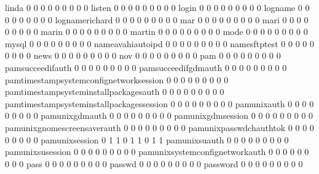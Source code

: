 \documentclass[compress,8pt]{beamer}
\begin{document}
\begin{frame}
\begin{Schunk}
  linda                                      0   0   0   0   0   0   0   0   0
  listen                                     0   0   0   0   0   0   0   0   0
  login                                      0   0   0   0   0   0   0   0   0
  logname                                    0   0   0   0   0   0   0   0   0
  lognamerichard                             0   0   0   0   0   0   0   0   0
  mar                                        0   0   0   0   0   0   0   0   0
  mari                                       0   0   0   0   0   0   0   0   0
  marin                                      0   0   0   0   0   0   0   0   0
  martin                                     0   0   0   0   0   0   0   0   0
  mode                                       0   0   0   0   0   0   0   0   0
  mysql                                      0   0   0   0   0   0   0   0   0
  nameavahiautoipd                           0   0   0   0   0   0   0   0   0
  namesftptest                               0   0   0   0   0   0   0   0   0
  news                                       0   0   0   0   0   0   0   0   0
  nov                                        0   0   0   0   0   0   0   0   0
  pam                                        0   0   0   0   0   0   0   0   0
  pamsucceedifauth                           0   0   0   0   0   0   0   0   0
  pamsucceedifgdmauth                        0   0   0   0   0   0   0   0   0
  pamtimestampsystemconfignetworksession     0   0   0   0   0   0   0   0   0
  pamtimestampsysteminstallpackagesauth      0   0   0   0   0   0   0   0   0
  pamtimestampsysteminstallpackagessession   0   0   0   0   0   0   0   0   0
  pamunixauth                                0   0   0   0   0   0   0   0   0
  pamunixgdmauth                             0   0   0   0   0   0   0   0   0
  pamunixgdmsession                          0   0   0   0   0   0   0   0   0
  pamunixgnomescreensaverauth                0   0   0   0   0   0   0   0   0
  pamunixpasswdchauthtok                     0   0   0   0   0   0   0   0   0
  pamunixsession                             0   1   1   0   1   1   0   1   1
  pamunixsuauth                              0   0   0   0   0   0   0   0   0
  pamunixsusession                           0   0   0   0   0   0   0   0   0
  pamunixsystemconfignetworkauth             0   0   0   0   0   0   0   0   0
  pass                                       0   0   0   0   0   0   0   0   0
  passwd                                     0   0   0   0   0   0   0   0   0
  password                                   0   0   0   0   0   0   0   0   0

\end{Schunk}
\end{frame}
\end{document}
